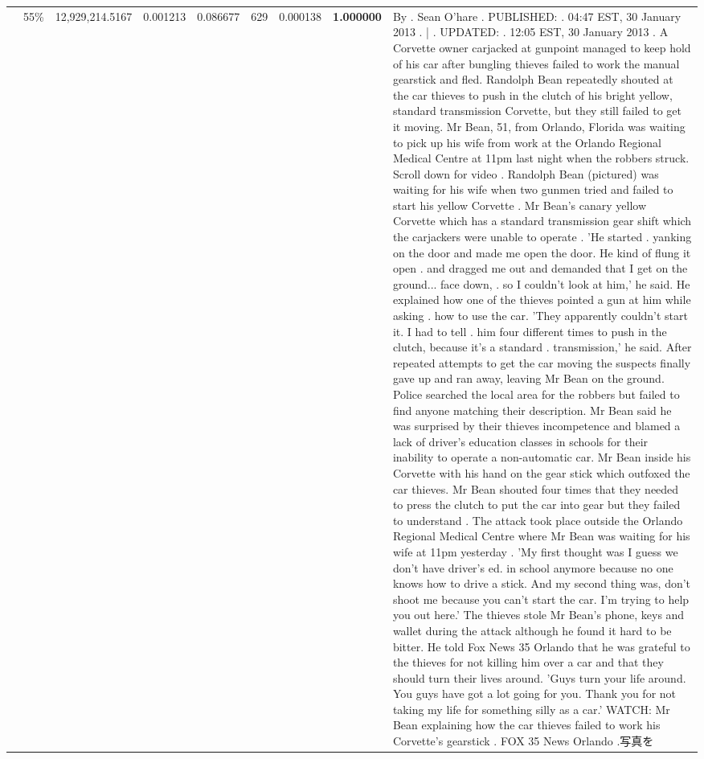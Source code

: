 \begin{table}[H]
\begin{tabular}{llrrrrrrl}
 & 55\% & 12,929,214.5167 & 0.001213 & 0.086677 & \color{red} 629 & 0.000138 & \bfseries \color{red} 1.000000 & By . Sean O'hare . PUBLISHED: . 04:47 EST, 30 January 2013 . | . UPDATED: . 12:05 EST, 30 January 2013 . A Corvette owner carjacked at gunpoint managed to keep hold of his car after bungling thieves failed to work the manual gearstick and fled. Randolph Bean repeatedly shouted at the car thieves to push in the clutch of his bright yellow, standard transmission Corvette, but they still failed to get it moving. Mr Bean, 51, from Orlando, Florida was waiting to pick up his wife from work at the Orlando Regional Medical Centre at 11pm last night when the robbers struck. Scroll down for video . Randolph Bean (pictured) was waiting for his wife when two gunmen tried and failed to start his yellow Corvette . Mr Bean's canary yellow Corvette which has a standard transmission gear shift which the carjackers were unable to operate . 'He started . yanking on the door and made me open the door. He kind of flung it open . and dragged me out and demanded that I get on the ground... face down, . so I couldn't look at him,' he said. He explained how one of the thieves pointed a gun at him while asking . how to use the car. 'They apparently couldn't start it. I had to tell . him four different times to push in the clutch, because it's a standard . transmission,' he said. After repeated attempts to get the car moving the suspects finally gave up and ran away, leaving Mr Bean on the ground. Police searched the local area for the robbers but failed to find anyone matching their description. Mr Bean said he was surprised by their thieves incompetence and blamed a lack of driver's education classes in schools for their inability to operate a non-automatic car. Mr Bean inside his Corvette with his hand on the gear stick which outfoxed the car thieves. Mr Bean shouted four times that they needed to press the clutch to put the car into gear but they failed to understand . The attack took place outside the Orlando Regional Medical Centre where Mr Bean was waiting for his wife at 11pm yesterday . 'My first thought was I guess we don't have driver's ed. in school anymore because no one knows how to drive a stick. And my second thing was, don't shoot me because you can't start the car. I'm trying to help you out here.' The thieves stole Mr Bean's phone, keys and wallet during the attack although he found it hard to be bitter. He told Fox News 35 Orlando that he was grateful to the thieves for not killing him over a car and that they should turn their lives around. 'Guys turn your life around. You guys have got a lot going for you. Thank you for not taking my life for something silly as a car.' WATCH: Mr Bean explaining how the car thieves failed to work his Corvette's gearstick . FOX 35 News Orlando .写真を \\

\end{tabular}
\end{table}
